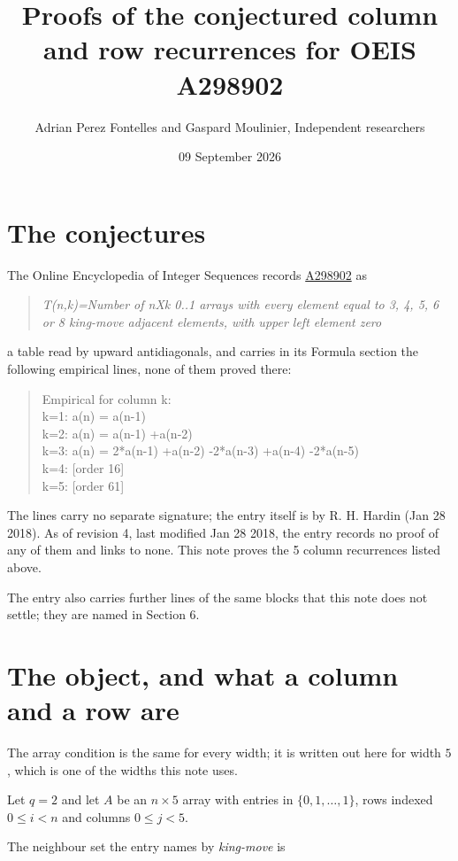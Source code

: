 \documentclass[11pt]{article}
\title{Proofs of the conjectured column and row recurrences for OEIS A298902}
\author{Adrian Perez Fontelles and Gaspard Moulinier, Independent researchers}
\date{09 September 2026}
\theoremstyle{definition}
\begin{document}
\maketitle
\section{The conjectures}

The Online Encyclopedia of Integer Sequences records \href{https://oeis.org/A298902}{A298902} as

\begin{quote}\itshape T(n,k)=Number of nXk 0..1 arrays with every element equal to 3, 4, 5, 6 or 8 king-move adjacent elements, with upper left element zero\end{quote}

a table read by upward antidiagonals, and carries in its Formula section the following empirical lines, none of them proved there:

\begin{quote}\ttfamily Empirical for column k:\\
k=1: a(n) = a(n-1)\\k=2: a(n) = a(n-1) +a(n-2)\\k=3: a(n) = 2*a(n-1) +a(n-2) -2*a(n-3) +a(n-4) -2*a(n-5)\\k=4: [order 16]\\k=5: [order 61]\end{quote}

The lines carry no separate signature; the entry itself is by R. H. Hardin (Jan 28 2018). As of revision 4, last modified Jan 28 2018, the entry records no proof of any of them and links to none. This note proves the 5 column recurrences listed above.

The entry also carries further lines of the same blocks that this note does not settle; they are named in Section 6.

\section{The object, and what a column and a row are}

The array condition is the same for every width; it is written out here for width $5$, which is one of the widths this note uses.

Let $q = 2$ and let $A$ be an $n \times 5$ array with entries in $\{0,1,\dots,1\}$, rows indexed $0 \le i < n$ and columns $0 \le j < 5$.

The neighbour set the entry names by {\itshape king-move} is
\end{document}
